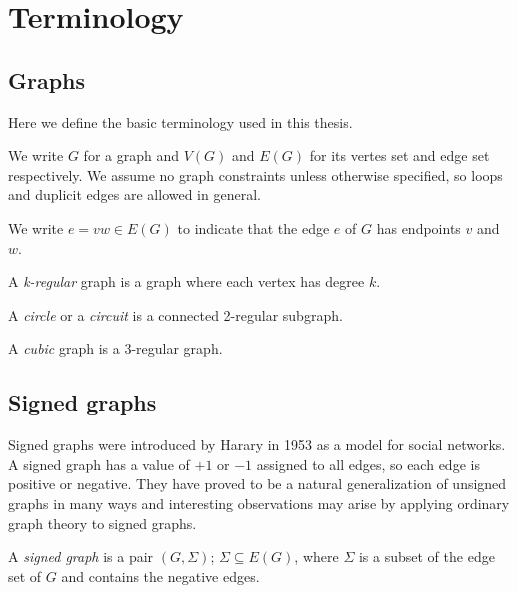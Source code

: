 \chapter{Terminology}\label{ch:preliminaries}

\section{Graphs}

Here we define the basic terminology used in this thesis.

\begin{definition}
    We write $G$ for a graph and $V(G)$ and $E(G)$ for its vertes set and edge set respectively.
    We assume no graph constraints unless otherwise specified, so loops and duplicit edges are allowed in general.
\end{definition}

\begin{definition}
    We write $e = vw \in E(G)$ to indicate that the edge $e$ of $G$ has endpoints $v$ and $w$.
\end{definition}

\begin{definition}
    A \textit{k-regular} graph is a graph where each vertex has degree $k$.
\end{definition}

\begin{definition}
    A \textit{circle} or a \textit{circuit} is a connected 2-regular subgraph.
\end{definition}

\begin{definition}
    A \textit{cubic} graph is a 3-regular graph.
\end{definition}

\section{Signed graphs}

Signed graphs were introduced by Harary\cite{harary} in 1953 as a model for social networks. 
A signed graph has a value of $+1$ or $-1$ assigned to all edges, so each edge is positive or negative.
They have proved to be a natural generalization of unsigned graphs in many ways and interesting observations may arise
by applying ordinary graph theory to signed graphs.

\begin{definition}
    A \textit{signed graph} is a pair $(G, \Sigma)$; $\Sigma \subseteq E(G)$, where $\Sigma$ is a subset of the edge set of $G$ and contains the negative edges.
\end{definition}

